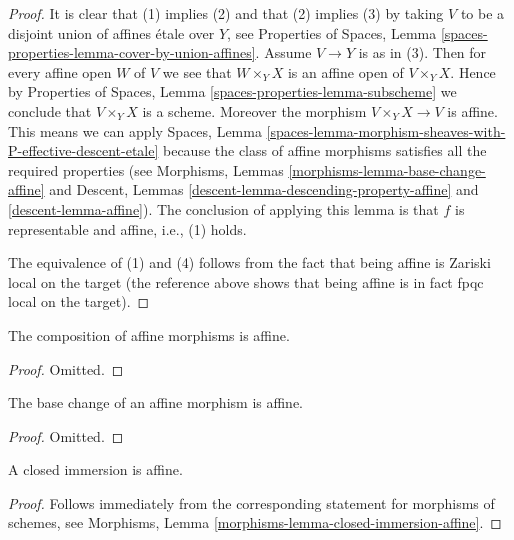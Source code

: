 \begin{proof}
It is clear that (1) implies (2) and that (2) implies (3) by taking
$V$ to be a disjoint union of affines \'etale over $Y$, see
Properties of Spaces,
Lemma \ref{spaces-properties-lemma-cover-by-union-affines}.
Assume $V \to Y$ is as in (3). Then for every affine open $W$ of $V$ we see
that $W \times_Y X$ is an affine open of $V \times_Y X$. Hence by
Properties of Spaces, Lemma \ref{spaces-properties-lemma-subscheme}
we conclude that $V \times_Y X$ is a scheme. Moreover the morphism
$V \times_Y X \to V$ is affine. This means we can apply
Spaces,
Lemma \ref{spaces-lemma-morphism-sheaves-with-P-effective-descent-etale}
because the class of affine morphisms satisfies all the required
properties (see
Morphisms, Lemmas \ref{morphisms-lemma-base-change-affine} and
Descent, Lemmas \ref{descent-lemma-descending-property-affine}
and \ref{descent-lemma-affine}). The conclusion of applying this lemma
is that $f$ is representable and affine, i.e., (1) holds.

\medskip\noindent
The equivalence of (1) and (4) follows from the fact that being
affine is Zariski local on the target (the reference above shows
that being affine is in fact fpqc local on the target).
\end{proof}

\begin{lemma}
\label{lemma-composition-affine}
The composition of affine morphisms is affine.
\end{lemma}

\begin{proof}
Omitted.
\end{proof}

\begin{lemma}
\label{lemma-base-change-affine}
The base change of an affine morphism is affine.
\end{lemma}

\begin{proof}
Omitted.
\end{proof}

\begin{lemma}
\label{lemma-closed-immersion-affine}
A closed immersion is affine.
\end{lemma}

\begin{proof}
Follows immediately from the corresponding statement for morphisms of
schemes, see Morphisms, Lemma \ref{morphisms-lemma-closed-immersion-affine}.
\end{proof}

